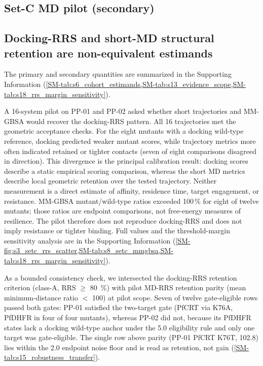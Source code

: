 \documentclass[journal=jcisd8,manuscript=article,layout=traditional]{achemso}
\begin{document}
\subsection{Set-C MD pilot (secondary)}
\label{sec:setc_pilot}

\subsection{Docking-RRS and short-MD structural retention are non-equivalent estimands}\label{sec:non_equiv_estimands}

The primary and secondary quantities are summarized in the Supporting Information (\cref{SM-tab:s6_cohort_estimands,SM-tab:s13_evidence_scope,SM-tab:s18_rrs_margin_sensitivity}).

A 16-system pilot on PP-01 and PP-02 asked whether short trajectories and MM-GBSA would recover the docking-RRS pattern. All 16 trajectories met the geometric acceptance checks. For the eight mutants with a docking wild-type reference, docking predicted weaker mutant scores, while trajectory metrics more often indicated retained or tighter contacts (seven of eight comparisons disagreed in direction). This divergence is the principal calibration result: docking scores describe a static empirical scoring comparison, whereas the short MD metrics describe local geometric retention over the tested trajectory. Neither measurement is a direct estimate of affinity, residence time, target engagement, or resistance. MM-GBSA mutant/wild-type ratios exceeded \num{100}\,\% for eight of twelve mutants; those ratios are endpoint comparisons, not free-energy measures of resilience. The pilot therefore does not reproduce docking-RRS and does not imply resistance or tighter binding. Full values and the threshold-margin sensitivity analysis are in the Supporting Information (\cref{SM-fig:s3_setc_rrs_scatter,SM-tab:s8_setc_mmgbsa,SM-tab:s18_rrs_margin_sensitivity}).

As a bounded consistency check, we intersected the docking-RRS retention criterion (class-A, RRS $\geq$ \qty{80}{\percent}) with pilot MD-RRS retention parity (mean minimum-distance ratio $<$ \num{100}) at pilot scope. Seven of twelve gate-eligible rows passed both gates: PP-01 satisfied the two-target gate (PfCRT via K76A, PfDHFR in four of four mutants), whereas PP-02 did not, because its PfDHFR states lack a docking wild-type anchor under the \qty{5.0}{\kcalmol} eligibility rule and only one target was gate-eligible. The single row above parity (PP-01 PfCRT K76T, \num{102.8}) lies within the \qty{2.0}{\kcalmol} endpoint noise floor and is read as retention, not gain (\cref{SM-tab:s15_robustness_transfer}).
\end{document}
